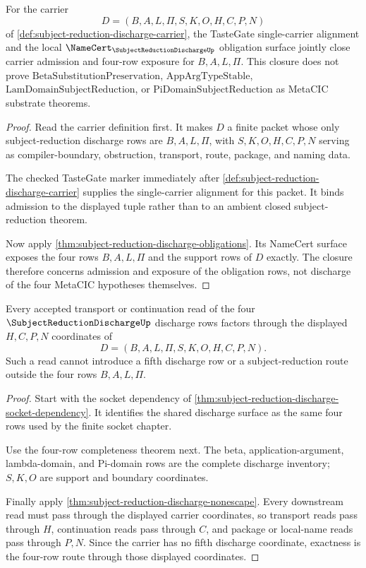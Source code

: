 \begin{theorem}
\label{thm:subject-reduction-discharge-tastegate-obligation-closure}
For the carrier
$$
D=(B,A,L,\Pi,S,K,O,H,C,P,N)
$$
of \autoref{def:subject-reduction-discharge-carrier}, the TasteGate single-carrier alignment and the local $\NameCert_{\SubjectReductionDischargeUp}$ obligation surface jointly close carrier admission and four-row exposure for $B,A,L,\Pi$. This closure does not prove $\mathrm{BetaSubstitutionPreservation}$, $\mathrm{AppArgTypeStable}$, $\mathrm{LamDomainSubjectReduction}$, or $\mathrm{PiDomainSubjectReduction}$ as MetaCIC substrate theorems.
\end{theorem}
\begin{proof}
Read the carrier definition first. It makes $D$ a finite packet whose only subject-reduction discharge rows are $B,A,L,\Pi$, with $S,K,O,H,C,P,N$ serving as compiler-boundary, obstruction, transport, route, package, and naming data.

The checked TasteGate marker immediately after \autoref{def:subject-reduction-discharge-carrier} supplies the single-carrier alignment for this packet. It binds admission to the displayed tuple rather than to an ambient closed subject-reduction theorem.

Now apply \autoref{thm:subject-reduction-discharge-obligations}. Its NameCert surface exposes the four rows $B,A,L,\Pi$ and the support rows of $D$ exactly. The closure therefore concerns admission and exposure of the obligation rows, not discharge of the four MetaCIC hypotheses themselves.
\end{proof}

\begin{theorem}
\label{thm:subject-reduction-discharge-transport-route-exactness}
Every accepted transport or continuation read of the four $\SubjectReductionDischargeUp$ discharge rows factors through the displayed $H,C,P,N$ coordinates of
$$
D=(B,A,L,\Pi,S,K,O,H,C,P,N).
$$
Such a read cannot introduce a fifth discharge row or a subject-reduction route outside the four rows $B,A,L,\Pi$.
\end{theorem}
\begin{proof}
Start with the socket dependency of \autoref{thm:subject-reduction-discharge-socket-dependency}. It identifies the shared discharge surface as the same four rows used by the finite socket chapter.

Use the four-row completeness theorem next. The beta, application-argument, lambda-domain, and Pi-domain rows are the complete discharge inventory; $S,K,O$ are support and boundary coordinates.

Finally apply \autoref{thm:subject-reduction-discharge-nonescape}. Every downstream read must pass through the displayed carrier coordinates, so transport reads pass through $H$, continuation reads pass through $C$, and package or local-name reads pass through $P,N$. Since the carrier has no fifth discharge coordinate, exactness is the four-row route through those displayed coordinates.
\end{proof}

